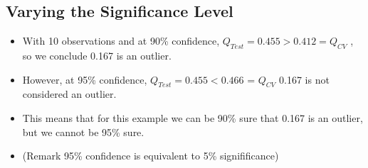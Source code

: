\documentclass[a4paper,12pt]{article}
\begin{document}
\newpage




\subsection*{Varying the Significance Level}
\begin{itemize}
\item	With 10 observations and at 90\% confidence, $Q_{Test} = 0.455 > 0.412 =Q_{CV}$ , so we conclude 0.167 is an outlier.
\item  However, at 95\% confidence, $Q_{Test} = 0.455 < 0.466$ = $Q_{CV}$ 0.167 is not considered an outlier. 

\item This means that for this example we can be 90\% sure that 0.167 is an outlier, but we cannot be 95\% sure.
\bigskip
\item (Remark 95\% confidence is equivalent to 5\% signifificance)
\end{itemize}	


\end{document}
